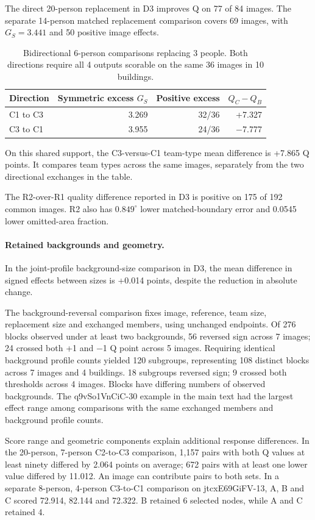 The direct 20-person replacement in D3 improves Q on 77 of 84 images. The separate 14-person matched replacement comparison covers 69 images, with $G_S=3.441$ and 50 positive image effects.

\begin{table}[ht]
\centering\small
\caption{Bidirectional 6-person comparisons replacing 3 people. Both directions require all 4 outputs scorable on the same 36 images in 10 buildings.}
\label{tab:bidirectional-half}
\begin{tabular}{lrrr}
\toprule
Direction & Symmetric excess $G_S$ & Positive excess & $Q_C-Q_B$\\
\midrule
C1 to C3 & 3.269 & 32/36 & +7.327\\
C3 to C1 & 3.955 & 24/36 & $-$7.777\\
\bottomrule
\end{tabular}
\end{table}
On this shared support, the C3-versus-C1 team-type mean difference is +7.865 Q points. It compares team types across the same images, separately from the two directional exchanges in the table.

The R2-over-R1 quality difference reported in D3 is positive on 175 of 192 common images. R2 also has $0.849^\circ$ lower matched-boundary error and 0.0545 lower omitted-area fraction.

\paragraph{Retained backgrounds and geometry.}
In the joint-profile background-size comparison in D3, the mean difference in signed effects between sizes is +0.014 points, despite the reduction in absolute change.

The background-reversal comparison fixes image, reference, team size, replacement size and exchanged members, using unchanged endpoints. Of 276 blocks observed under at least two backgrounds, 56 reversed sign across 7 images; 24 crossed both +1 and $-$1 Q point across 5 images. Requiring identical background profile counts yielded 120 subgroups, representing 108 distinct blocks across 7 images and 4 buildings. 18 subgroups reversed sign; 9 crossed both thresholds across 4 images. Blocks have differing numbers of observed backgrounds. The q9vSo1VnCiC-30 example in the main text had the largest effect range among comparisons with the same exchanged members and background profile counts.

Score range and geometric components explain additional response differences. In the 20-person, 7-person C2-to-C3 comparison, 1,157 pairs with both Q values at least ninety differed by 2.064 points on average; 672 pairs with at least one lower value differed by 11.012. An image can contribute pairs to both sets. In a separate 8-person, 4-person C3-to-C1 comparison on jtcxE69GiFV-13, A, B and C scored 72.914, 82.144 and 72.322. B retained 6 selected nodes, while A and C retained 4.

